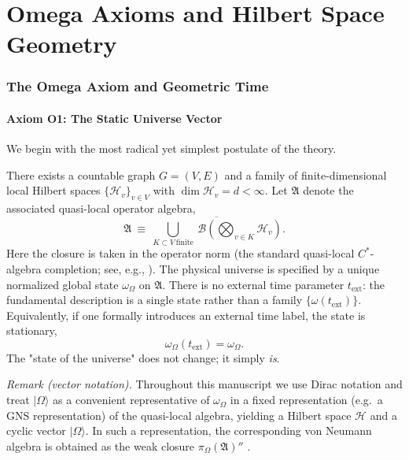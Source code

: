 \part{Omega Axioms and Hilbert Space Geometry}
\label{part:II}

\section{The Omega Axiom and Geometric Time}
\label{chap:omega_axiom}

\subsection{Axiom O1: The Static Universe Vector}
We begin with the most radical yet simplest postulate of the theory.

\begin{axiom}
There exists a countable graph $G=(V,E)$ and a family of finite-dimensional local Hilbert spaces $\{\mathcal{H}_v\}_{v\in V}$ with $\dim \mathcal{H}_v=d<\infty$. Let $\mathfrak{A}$ denote the associated quasi-local operator algebra,
\begin{equation}
    \mathfrak{A}\ \equiv\ \overline{\bigcup_{K\subset V\ \mathrm{finite}}\ \mathcal{B}\!\left(\bigotimes_{v\in K}\mathcal{H}_v\right)}.
\end{equation}
Here the closure is taken in the operator norm (the standard quasi-local $C^\ast$-algebra completion; see, e.g., \cite{BratteliRobinson1987OAQSM1}).
The physical universe is specified by a unique normalized global state $\omega_{\Omega}$ on $\mathfrak{A}$. There is no external time parameter $t_{\text{ext}}$: the fundamental description is a single state rather than a family $\{\omega(t_{\text{ext}})\}$. Equivalently, if one formally introduces an external time label, the state is stationary,
\begin{equation}
    \omega_{\Omega}(t_{\text{ext}})=\omega_{\Omega}.
\end{equation}
The "state of the universe" does not change; it simply \textit{is}.
\end{axiom}

\noindent\textit{Remark (vector notation).} Throughout this manuscript we use Dirac notation and treat $|\Omega\rangle$ as a convenient representative of $\omega_{\Omega}$ in a fixed representation (e.g.\ a GNS representation) of the quasi-local algebra, yielding a Hilbert space $\mathcal{H}$ and a cyclic vector $|\Omega\rangle$. In such a representation, the corresponding von Neumann algebra is obtained as the weak closure $\pi_\Omega(\mathfrak{A})''$ \cite{BratteliRobinson1987OAQSM1,Takesaki2002}.

